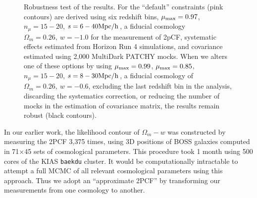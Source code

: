 \documentclass[iop]{emulateapj}
\begin{document}
\begin{figure}
   \caption{\label{fig_contest}
   Robustness test of the results.
   For the ``default'' constraints (pink contours) are derived using six redshift bins, 
   $\mu_{\rm max}=0.97$, $n_{\mu}=15-20$, $s=6-40 \rm Mpc/h$,
   a fiducial cosmology $\Omega_m=0.26,\ w=-1.0$ for the measurement of 2pCF,
   systematic effects estimated from Horizon Run 4 simulations, 
   and covariance estimated using 2,000 MultiDark PATCHY mocks.
   When we alters one of these options by using $\mu_{\rm max}=0.99$, 
   $\mu_{\rm max}=0.85$, $n_{\mu}=15-20$, $s=8-30 \rm Mpc/h$, 
   a fiducial cosmology of $\Omega_m=0.26,\ w=-0.6$, 
   excluding the last redshift bin in the analysis, 
   discarding the systematics correction, 
   or reducing the number of mocks in the estimation of covariance matrix,
   the results remain robust (black contours).
   }
\end{figure}

In our earlier work\cite{Li2016}, the likelihood contour of $\Omega_m-w$ was constructed by
measuring the 2PCF 3,375 times,
using 3D positions of BOSS galaxies computed in 71$\times$45 sets of cosmological parameters.
This procedure took 1 month using 500 cores of the KIAS {\texttt {baekdu}} cluster.
It would be computationally intractable to attempt a full MCMC of all relevant cosmological parameters using this approach. 
Thus we adopt an ``approximate 2PCF'' by transforming our measurements from one cosmology to another.
\end{document}
